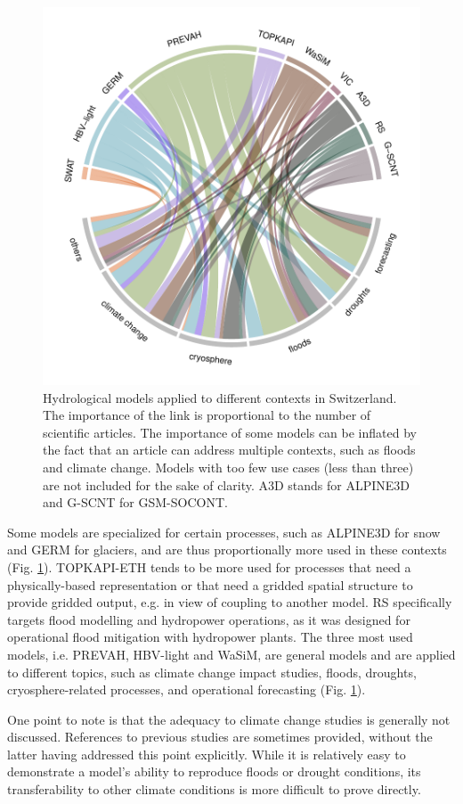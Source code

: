 \documentclass[10pt,a4paper]{article}
\begin{document}
\begin{figure}[htb]
	\begin{center}
		\includegraphics[width=0.70\columnwidth]{figures/chord_diagram}
		\caption{{Hydrological models applied to different contexts in Switzerland. The
				importance of the link is proportional to the number of scientific
				articles. The importance of some models can be inflated by the fact that
				an article can address multiple contexts, such as floods and climate
				change. Models with too few use cases (less than three) are not included
				for the sake of clarity. A3D stands for ALPINE3D and G-SCNT for
				GSM-SOCONT.
				{\label{fig:applications}}
		}}
	\end{center}
\end{figure}

Some models are specialized for certain processes, such as ALPINE3D for
snow and GERM for glaciers, and are thus proportionally more used in
these contexts (Fig. \ref{fig:applications}). TOPKAPI-ETH tends
to be more used for processes that need a physically-based
representation or that need a gridded spatial structure to provide
gridded output, e.g. in view of coupling to another model. RS
specifically targets flood modelling and hydropower operations, as it
was designed for operational flood mitigation with hydropower plants.
The three most used models, i.e. PREVAH, HBV-light and WaSiM, are
general models and are applied to different topics, such as climate
change impact studies, floods, droughts, cryosphere-related processes,
and operational forecasting (Fig. \ref{fig:applications}).

One point to note is that the adequacy to climate change studies is
generally not discussed. References to previous studies are sometimes
provided, without the latter having addressed this point explicitly.
While it is relatively easy to demonstrate a model's ability to
reproduce floods or drought conditions, its transferability to other
climate conditions is more difficult to prove directly.
\end{document}
